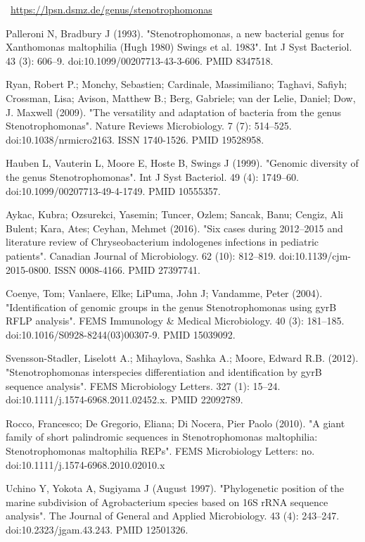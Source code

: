 \documentclass[11pt]{article}
\begin{document}
\begin{thebibliography}{3}
	 ~\url{https://lpsn.dsmz.de/genus/stenotrophomonas}
	
	 Palleroni N, Bradbury J (1993). "Stenotrophomonas, a new bacterial genus for Xanthomonas maltophilia (Hugh 1980) Swings et al. 1983". Int J Syst Bacteriol. 43 (3): 606–9. doi:10.1099/00207713-43-3-606. PMID 8347518.
	
	 Ryan, Robert P.; Monchy, Sebastien; Cardinale, Massimiliano; Taghavi, Safiyh; Crossman, Lisa; Avison, Matthew B.; Berg, Gabriele; van der Lelie, Daniel; Dow, J. Maxwell (2009). "The versatility and adaptation of bacteria from the genus Stenotrophomonas". Nature Reviews Microbiology. 7 (7): 514–525. doi:10.1038/nrmicro2163. ISSN 1740-1526. PMID 19528958.
	
	 Hauben L, Vauterin L, Moore E, Hoste B, Swings J (1999). "Genomic diversity of the genus Stenotrophomonas". Int J Syst Bacteriol. 49 (4): 1749–60. doi:10.1099/00207713-49-4-1749. PMID 10555357.
	
	 Aykac, Kubra; Ozsurekci, Yasemin; Tuncer, Ozlem; Sancak, Banu; Cengiz, Ali Bulent; Kara, Ates; Ceyhan, Mehmet (2016). "Six cases during 2012–2015 and literature review of Chryseobacterium indologenes infections in pediatric patients". Canadian Journal of Microbiology. 62 (10): 812–819. doi:10.1139/cjm-2015-0800. ISSN 0008-4166. PMID 27397741.
	
	 Coenye, Tom; Vanlaere, Elke; LiPuma, John J; Vandamme, Peter (2004). "Identification of genomic groups in the genus Stenotrophomonas using gyrB RFLP analysis". FEMS Immunology \& Medical Microbiology. 40 (3): 181–185. doi:10.1016/S0928-8244(03)00307-9. PMID 15039092.
	
	 Svensson-Stadler, Liselott A.; Mihaylova, Sashka A.; Moore, Edward R.B. (2012). "Stenotrophomonas interspecies differentiation and identification by gyrB sequence analysis". FEMS Microbiology Letters. 327 (1): 15–24. doi:10.1111/j.1574-6968.2011.02452.x. PMID 22092789.
	
	 Rocco, Francesco; De Gregorio, Eliana; Di Nocera, Pier Paolo (2010). "A giant family of short palindromic sequences in Stenotrophomonas maltophilia: Stenotrophomonas maltophilia REPs". FEMS Microbiology Letters: no. doi:10.1111/j.1574-6968.2010.02010.x
	
	
	 Uchino Y, Yokota A, Sugiyama J (August 1997). "Phylogenetic position of the marine subdivision of Agrobacterium species based on 16S rRNA sequence analysis". The Journal of General and Applied Microbiology. 43 (4): 243–247. doi:10.2323/jgam.43.243. PMID 12501326.
	

\end{thebibliography}
\end{document}
